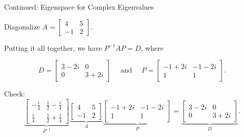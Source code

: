 \documentclass[xcolor=dvipsnames,aspectratio=169,t]{beamer}
\begin{document}
\begin{frame}{Continued: Eigenspace for Complex Eigenvalues}
  \begin{example}
  Diagonalize $A = \begin{bmatrix} 4 & 5 \\ -1 & 2 \end{bmatrix}$.
  \end{example}
  \bigskip
  
  Putting it all together, we have $P^{-1} A P = D$, where
  
  \[
    D=\begin{bmatrix} 3-2i & 0 \\ 0 & 3+2i \end{bmatrix}
    \quad \text{ and } \quad
    P=\begin{bmatrix} -1+2i & -1-2i \\ 1 & 1 \end{bmatrix}.
  \]
  \smallskip
  
  \pause
  Check:
  \[
    \underbrace{
    \left[\begin{matrix}- \frac{i}{4} & \frac{1}{2} - \frac{i}{4}\\[.3em]
    \frac{i}{4} & \frac{1}{2} + \frac{i}{4}\end{matrix}\right]}_{P^{-1}}
    \underbrace{\begin{bmatrix} 4 & 5 \\ -1 & 2 \end{bmatrix}}_A
    \underbrace{\begin{bmatrix} -1+2i & -1-2i \\ 1 & 1 \end{bmatrix}}_P
    =
    \underbrace{\begin{bmatrix} 3-2i & 0 \\ 0 & 3+2i \end{bmatrix}}_D.
  \]
  
\end{frame}
\end{document}
